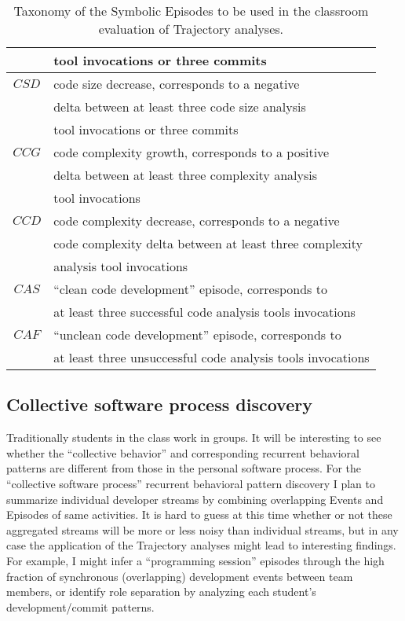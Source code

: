 \begin{table}
\begin{center}
\begin{tabular}{ | c | l | }
													& tool invocations or three commits \\
		\hline
		$CSD$ 								& code size decrease, corresponds to a negative \\
													& delta between at least three code size analysis \\
													& tool invocations or three commits \\																										
		\hline
		$CCG$ 								& code complexity growth, corresponds to a positive \\
													& delta between at least three complexity analysis \\
													& tool invocations \\
		\hline
		$CCD$ 								& code complexity decrease, corresponds to a negative \\
													& code complexity delta between at least three complexity \\
													& analysis tool invocations \\													
		\hline
		$CAS$ 								& ``clean code development'' episode, corresponds to \\
													& at least three successful code analysis tools invocations \\
		\hline
		$CAF$ 								& ``unclean code development'' episode, corresponds to \\
													& at least three unsuccessful code analysis tools invocations \\
		\hline		
	  \end{tabular}
    \caption{Taxonomy of the Symbolic Episodes to be used in the classroom evaluation of Trajectory analyses.}
    \label{fig:data_collected_intervals}
    \end{center}
\end{table}

\subsection{Collective software process discovery}
Traditionally students in the class work in groups. It will be interesting to see whether the ``collective behavior'' and corresponding recurrent behavioral patterns are different from those in the personal software process. For the ``collective software process'' recurrent behavioral pattern discovery I plan to summarize individual developer streams by combining overlapping Events and Episodes of same activities. It is hard to guess at this time whether or not these aggregated streams will be more or less noisy than individual streams, but in any case the application of the Trajectory analyses might lead to interesting findings. For example, I might infer a ``programming session'' episodes through the high fraction of synchronous (overlapping) development events between team members, or identify role separation by analyzing each student's development/commit patterns.
